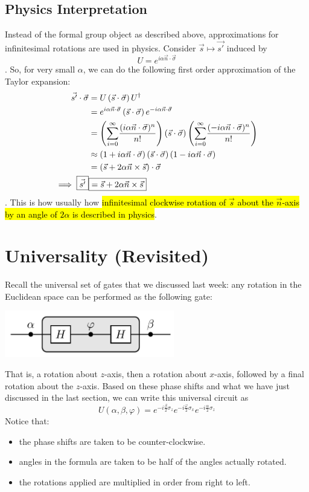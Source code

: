 \documentclass[12pt]{article}
\begin{document}
\subsection{Physics Interpretation}
Instead of the formal group object as described above, approximations for infinitesimal rotations are used in physics. Consider $\vec{s}\mapsto \vec{s'}$ induced by $$
U = e^{i\alpha \vec{n}\cdot\vec{\sigma}}
$$. So, for very small $\alpha$, we can do the following first order approximation of the Taylor expansion: $$
\begin{aligned}
\vec{s'} \cdot \vec{\sigma}
    &= U\left(\vec{s}\cdot \vec{\sigma}\right) U^\dag\\
    &= e^{i\alpha \vec{n}\cdot \vec{\sigma}}\left(\vec{s}\cdot \vec{\sigma}\right) e^{-i\alpha \vec{n}\cdot \vec{\sigma}}\\
    &= \left(\overset{\infty}{\underset{i=0}{\sum}}\frac{(i\alpha \vec{n}\cdot \vec{\sigma})^n}{n!}\right)\left(\vec{s}\cdot \vec{\sigma}\right) \left(\overset{\infty}{\underset{i=0}{\sum}}\frac{(-i\alpha \vec{n}\cdot \vec{\sigma})^n}{n!}\right)\\
    &\approx \left(1 + i\alpha \vec{n}\cdot \vec{\sigma}\right)\left(\vec{s}\cdot \vec{\sigma}\right) \left(1 - i\alpha \vec{n}\cdot \vec{\sigma}\right)\\
    &= \left(\vec{s} + 2\alpha \vec{n}\times \vec{s}\right)\cdot \vec{\sigma}\\
\implies \boxed{\vec{s'}}
    &\boxed{= \vec{s} + 2\alpha \vec{n}\times \vec{s}}
\end{aligned}
$$. This is how usually how \hl{infinitesimal clockwise rotation of $\vec{s}$ about the $\vec{n}$-axis by an angle of $2\alpha$ is described in physics}.

\section{Universality (Revisited)}
Recall the universal set of gates that we discussed last week: any rotation in the Euclidean space can be performed as the following gate:
\begin{center}
\includegraphics[width = 20em]{images/7.jpg}
\end{center}
That is, a rotation about $z$-axis, then a rotation about $x$-axis, followed by a final rotation about the $z$-axis. Based on these phase shifts and what we have just discussed in the last section, we can write this universal circuit as $$
\boxed{U(\alpha, \beta, \varphi) = e^{-i\frac{\beta}{2}\sigma_z}e^{-i\frac{\varphi}{2}\sigma_x}e^{-i\frac{\alpha}{2}\sigma_z}}
$$
Notice that: \begin{itemize}
    \item the phase shifts are taken to be counter-clockwise.
    \item angles in the formula are taken to be half of the angles actually rotated.
    \item the rotations applied are multiplied in order from right to left.
\end{itemize}
\end{document}
